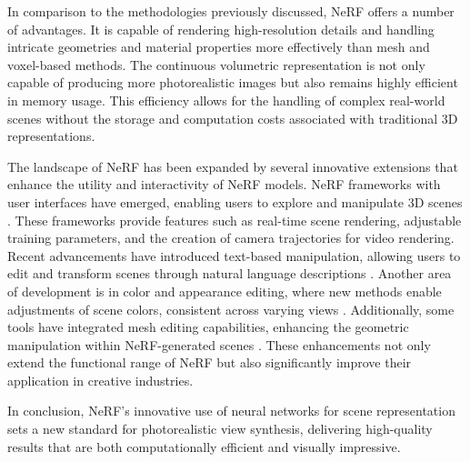 In comparison to the methodologies previously discussed, NeRF offers a number of advantages.
It is capable of rendering high-resolution details and handling intricate geometries and material properties more effectively than mesh and voxel-based methods.
The continuous volumetric representation is not only capable of producing more photorealistic images but also remains highly efficient in memory usage.
This efficiency allows for the handling of complex real-world scenes without the storage and computation costs associated with traditional 3D representations.

The landscape of NeRF has been expanded by several innovative extensions that enhance the utility and interactivity of NeRF models.
NeRF frameworks with user interfaces have emerged, enabling users to explore and manipulate 3D scenes \cite{muller_instant_2022,tancik_nerfstudio_2023}.
These frameworks provide features such as real-time scene rendering, adjustable training parameters, and the creation of camera trajectories for video rendering.
Recent advancements have introduced text-based manipulation, allowing users to edit and transform scenes through natural language descriptions \cite{bao_sine_2023,bar-tal_text2live_2022,haque_instruct-nerf2nerf_2023,jan-niklas_dihlmann_signerf_2024,wang_clip-nerf_2022}.
Another area of development is in color and appearance editing, where new methods enable adjustments of scene colors, consistent across varying views \cite{wu_palettenerf_2022}.
Additionally, some tools have integrated mesh editing capabilities, enhancing the geometric manipulation within NeRF-generated scenes \cite{yuan_nerf-editing_2022}.
These enhancements not only extend the functional range of NeRF but also significantly improve their application in creative industries.

In conclusion, NeRF's innovative use of neural networks for scene representation sets a new standard for photorealistic view synthesis, delivering high-quality results that are both computationally efficient and visually impressive.
